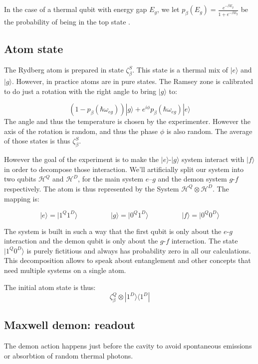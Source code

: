 \documentclass[10pt,a4paper]{report}
\theoremstyle{plain}
\theoremstyle{definition}
\theoremstyle{remark}
\newcommand{\ket}[1]{|#1\rangle}
\newcommand{\bra}[1]{\langle#1|}
\begin{document}
In the case of a thermal qubit with energy gap $E_g$, we let $p_\beta(E_g) =\frac
{e^{-\beta E_g}}{1 + e^{-\beta E_g}} $ be the probability of being in the top state .

\subsection{Atom state}

The Rydberg atom is prepared in state $\zeta_\beta^S$. This state is a thermal
mix of $\ket e$ and $\ket g$. However, in practice atoms are in pure states. The Ramsey
zone is calibrated to do just a rotation with the right angle to bring $\ket g$ to:

\[(1-p_\beta(\hbar \omega_{eg}))\ket g +
e^{i\phi}p_\beta(\hbar \omega_{eg}) \ket e\]
The angle and thus the temperature is chosen by the experimenter. However the
axis of the rotation is random, and thus the phase $\phi$ is also random. The
average of those states is thus $\zeta_\beta^S$.

However the goal of the experiment is to make the $\ket e$-$\ket g$ system
interact with $\ket f$ in order to decompose those interaction. We'll
artificially split our system into two qubits $\mathcal{H}^Q$ and $\mathcal{H}^D$, for the
main system $e$--$g$ and the demon system $g$-$f$ respectively. The atom is thus
represented by the System $\mathcal{H}^Q \otimes \mathcal{H}^D$. The mapping is:

\[\ket e = \ket {1^Q 1^D} \hspace{2cm} \ket g = \ket{0^Q 1^D} \hspace{2cm} \ket f
  = \ket{0^Q 0^D}\]

The system is built in such a way that the first qubit is only about the $e$-$g$
interaction and the demon qubit is only about the $g$-$f$ interaction. The state
$\ket {1^Q 0^D}$ is purely fictitious and always has probability zero in all our
calculations. This decomposition allows to speak about entanglement and other
concepts that need multiple systems on a single atom.

The initial atom state is thus:
\[\zeta_\beta^Q \otimes \ket {1^D} \bra {1^D}\]

\subsection{Maxwell demon: readout}

The demon action happens just before the cavity to avoid spontaneous emissions or
absorbtion of random thermal photons.
\end{document}
